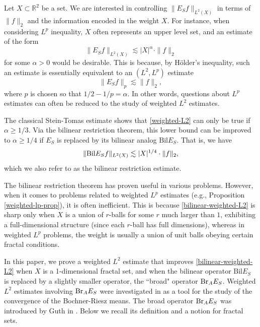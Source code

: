 \documentclass{amsart}
\numberwithin{equation}{section}
\newcommand{\al}{\alpha}
\newcommand{\ZR}{\mathbb{R}}
\newcommand{\BR}{{\rm{Br}}}
\begin{document}
Let $X\subset \ZR^2$ be a set.
We are interested in controlling $\|E_Sf\|_{L^2(X)}$ in terms of $\|f\|_2$ and the information encoded in the weight $X$. 
For instance, when considering $L^p$ inequality, $X$ often represents an upper level set, and an estimate of the form 
\begin{equation}
\label{weighted-L2}
    \|E_Sf\|_{L^2(X)}\lesssim |X|^{\al}\cdot\|f\|_2
\end{equation}
for some $\al>0$ would be desirable.
This is because, by H\"older's inequality, such an estimate is essentially equivalent to an $(L^2, L^p)$ estimate
\begin{equation}
\label{weighted-Lp}
    \|E_Sf\|_p\lesssim \|f\|_2,
\end{equation}
where $p$ is chosen so that $1/2-1/p=\al$.
In other words, questions about $L^p$ estimates can often be reduced to the study of weighted $L^2$ estimates. 




The classical Stein-Tomas estimate shows that \eqref{weighted-L2} can only be true if $\al\geq 1/3$.
Via the bilinear restriction theorem, this lower bound can be improved to $\al\geq1/4$ if $E_S$ is replaced by its bilinear analog $\text{Bil}E_S$.
That is, we have
\begin{equation}
\label{bilinear-weighted-L2}
    \|{\rm Bil}E_Sf\|_{L^2(X)}\lesssim |X|^{1/4}\cdot\|f\|_2,
\end{equation}
which we also refer to as the bilinear restriction estimate.

The bilinear restriction theorem has proven useful in various problems.
However, when it comes to problems related to weighted $L^p$ estimates (e.g., Proposition \ref{weighted-lp-prop}), it is often inefficient.
This is because \eqref{bilinear-weighted-L2} is sharp only when $X$ is a union of $r$-balls for some $r$ much larger than $1$, exhibiting a full-dimensional structure (since each $r$-ball has full dimensions), whereas in weighted $L^p$ problems, the weight is usually a union of unit balls obeying certain fractal conditions.


\smallskip

In this paper, we prove a weighted $L^2$ estimate that improves \eqref{bilinear-weighted-L2} when $X$ is a 1-dimensional fractal set, and when the bilinear operator $\text{Bil}E_S$ is replaced by a slightly smaller operator, the ``broad" operator $\BR_AE_S$.
Weighted $L^2$ estimates involving $\BR_AE_S$ were investigated in \cite{Li-Wu-24} as a tool for the study of the convergence of the Bochner-Riesz means.
The broad operator $\BR_A E_S$ was introduced by Guth in \cite{Guth-R3}.
Below we recall its definition and a notion for fractal sets.
\end{document}
